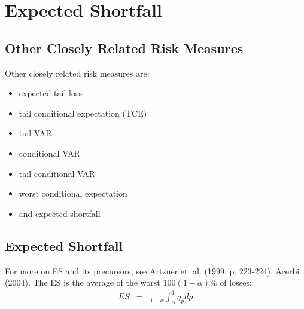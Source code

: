 \chapter{Expected Shortfall}

\section{Other Closely Related Risk Measures}
Other closely related risk measures are:
\begin{itemize}
	\item expected tail loss
	\item tail conditional expectation (TCE)
	\item tail VAR
	\item conditional VAR
	\item tail conditional VAR
	\item worst conditional expectation
	\item and expected shortfall
\end{itemize}

\section{Expected Shortfall}
For more on ES and its precursors, see Artzner et. al. (1999, p. 223-224), Acerbi (2004).
The ES is the average of the worst $100\left(1 - \alpha\right)\%$ of losses:
\begin{eqnarray}
	ES &=& \frac{1}{1 - \alpha}\int_{\alpha}^{1}q_{p}dp
\end{eqnarray}